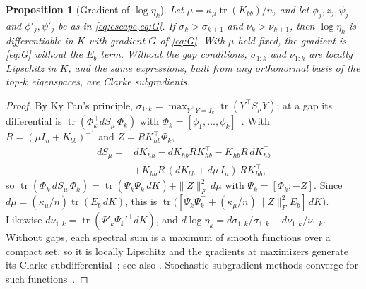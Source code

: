 \documentclass[11pt]{article}
\newtheorem{proposition}{Proposition}
\newcommand{\etak}{\eta_{k}}
\newcommand{\tr}{\operatorname{tr}}
\newcommand{\Smu}{S_{\mu}}
\begin{document}
\begin{proposition}[Gradient of $\log\etak$]
\label{prop:gradient}
Let $\mu=\kappa_\mu\tr(K_{bb})/n$, and let $\phi_j,z_j,\psi_j$ and $\phi'_j,\psi'_j$ be as in \cref{eq:escape,eq:G}. If $\sigma_k>\sigma_{k+1}$ and $\nu_k>\nu_{k+1}$, then $\log\etak$ is differentiable in $K$ with gradient $G$ of \cref{eq:G}. With $\mu$ held fixed, the gradient is \cref{eq:G} without the $E_b$ term. Without the gap conditions, $\sigma_{1:k}$ and $\nu_{1:k}$ are locally Lipschitz in $K$, and the same expressions, built from any orthonormal basis of the top-$k$ eigenspaces, are Clarke subgradients.
\end{proposition}
\begin{proof}
By Ky Fan's principle, $\sigma_{1:k}=\max_{Y^\top Y=I_k}\tr(Y^\top\Smu Y)$; at a gap its differential is $\tr(\Phi_k^\top d\Smu\,\Phi_k)$ with $\Phi_k=[\phi_1,\dots,\phi_k]$~\citep{kato1995perturbation,magnus1985differentiating}. With $R=(\mu I_n+K_{bb})^{-1}$ and $Z=RK_{hb}^\top\Phi_k$,
\begin{equation*}
\begin{aligned}
d\Smu={}&dK_{hh}-dK_{hb}RK_{hb}^\top-K_{hb}R\,dK_{hb}^\top\\
&+K_{hb}R\,(dK_{bb}+d\mu\,I_n)\,RK_{hb}^\top,
\end{aligned}
\end{equation*}
so $\tr(\Phi_k^\top d\Smu\,\Phi_k)=\tr(\Psi_k\Psi_k^\top dK)+\|Z\|_F^2\,d\mu$ with $\Psi_k=[\Phi_k;-Z]$. Since $d\mu=(\kappa_\mu/n)\tr(E_b\,dK)$, this is $\tr\bigl([\Psi_k\Psi_k^\top+(\kappa_\mu/n)\|Z\|_F^2E_b]\,dK\bigr)$. Likewise $d\nu_{1:k}=\tr(\Psi'_k\Psi_k'^\top dK)$, and $d\log\etak=d\sigma_{1:k}/\sigma_{1:k}-d\nu_{1:k}/\nu_{1:k}$. Without gaps, each spectral sum is a maximum of smooth functions over a compact set, so it is locally Lipschitz and the gradients at maximizers generate its Clarke subdifferential~\citep[Sec.~2.8]{clarke1983optimization}; see also \citet{overton1993optimality}. Stochastic subgradient methods converge for such functions~\citep{davis2020stochastic}.
\end{proof}
\end{document}
